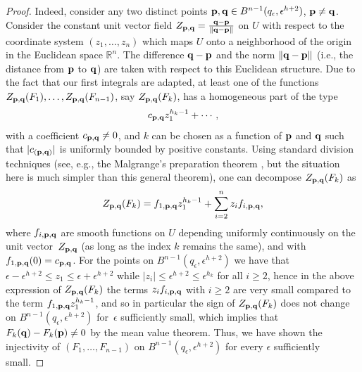\documentclass[pdftex]{sigma}
\numberwithin{equation}{section}
\begin{document}
\begin{proof}
Indeed, consider any two distinct points ${\bf p},{\bf q} \in B^{n-1}(q_\epsilon, \epsilon^{h+2})$, ${\bf p} \neq {\bf q}$.
Consider the constant unit vector f\/ield $Z_{{\bf p},{\bf q}} = \frac{{\bf q} - {\bf p}}{\|{\bf q} - {\bf p} \|}$
on $U$ with respect to the coordinate system $(z_1,\dots, z_n)$ which maps
$U$ onto a neighborhood of the origin in the Euclidean space $\mathbb{R}^n$.
The dif\/ference ${\bf q} - {\bf p}$ and the norm $\|{\bf q} - {\bf p} \|$
(i.e., the distance from ${\bf p}$ to ${\bf q}$) are taken with respect
to this Euclidean structure. Due to the fact that our
f\/irst integrals are adapted, at least one of the functions
$Z_{{\bf p},{\bf q}}(F_1), \dots, Z_{{\bf p},{\bf q}}(F_{n-1})$,
say $Z_{{\bf p},{\bf q}}(F_k)$, has a homogeneous part of the type
\begin{gather*} c_{{\bf p},{\bf q}} z_1^{h_k -1} + \cdots,
\end{gather*}
with a coef\/f\/icient $c_{{\bf p},{\bf q}} \neq 0$, and $k$ can be chosen
as a function of ${\bf p}$ and ${\bf q}$ such that $|c_{({\bf p},{\bf q})}|$
is uniformly bounded by positive constants. Using standard division techniques
(see, e.g., the Malgrange's preparation
theorem \cite{Malgrange-Ideal1967}, but the situation here is much simpler than this general theorem), one can decompose $Z_{{\bf p},{\bf q}}(F_k)$ as
\begin{gather*} Z_{{\bf p},{\bf q}}(F_k) = f_{1, {\bf p},{\bf q}}z_1^{h_k-1}
+ \sum_{i=2}^n z_i f_{i, {\bf p},{\bf q}},\end{gather*}
where $f_{i, {\bf p},{\bf q}}$ are smooth functions on $U$ depending uniformly
continuously on the unit vector~$Z_{{\bf p},{\bf q}}$ (as long as the index $k$ remains the same), and with $f_{1, {\bf p},{\bf q}}(0) = c_{{\bf p},{\bf q}}$.
For the points on $B^{n-1}(q_\epsilon, \epsilon^{h+2})$ we have that
$\epsilon - \epsilon^{h+2} \leq z_1 \leq \epsilon + \epsilon^{h+2}$
while $|z_i| \leq \epsilon^{h+2} \leq \epsilon^{h_k}$ for all $i \geq 2$,
hence in the above expression of $Z_{{\bf p},{\bf q}}(F_k)$ the terms
$z_i f_{i, {\bf p},{\bf q}}$ with $i \geq 2$ are very small compared to the
term $f_{1, {\bf p},{\bf q}}z_1^{h_k-1}$, and so in particular the sign of
$Z_{{\bf p},{\bf q}}(F_k)$ does not change on $B^{n-1}(q_\epsilon, \epsilon^{h+2})$ for~$\epsilon$ suf\/f\/iciently small, which implies that
$F_k({\bf q}) - F_k({\bf p}) \neq 0$ by the mean value theorem. Thus, we have shown the injectivity of $(F_1,\dots, F_{n-1})$ on $B^{n-1}(q_\epsilon, \epsilon^{h+2})$ for every $\epsilon$ suf\/f\/iciently small.


\end{proof}
\end{document}
